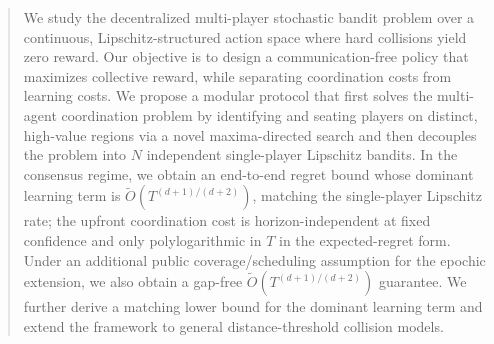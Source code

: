 

\begin{abstract}
We study the decentralized multi-player stochastic bandit problem over a continuous, Lipschitz-structured action space where hard collisions yield zero reward. Our objective is to design a communication-free policy that maximizes collective reward, while separating coordination costs from learning costs. We propose a modular protocol that first solves the multi-agent coordination problem by identifying and seating players on distinct, high-value regions via a novel maxima-directed search and then decouples the problem into $N$ independent single-player Lipschitz bandits. In the consensus regime, we obtain an end-to-end regret bound whose dominant learning term is \(\tilde{O}(T^{(d+1)/(d+2)})\), matching the single-player Lipschitz rate; the upfront coordination cost is horizon-independent at fixed confidence and only polylogarithmic in \(T\) in the expected-regret form. Under an additional public coverage/scheduling assumption for the epochic extension, we also obtain a gap-free \(\tilde{O}(T^{(d+1)/(d+2)})\) guarantee. We further derive a matching lower bound for the dominant learning term and extend the framework to general distance-threshold collision models.
\end{abstract}




